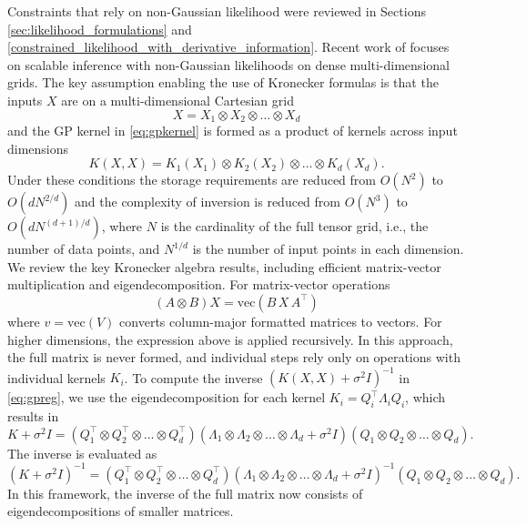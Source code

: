 \label{kronecker}
Constraints that rely on non-Gaussian likelihood were reviewed in Sections \ref{sec:likelihood_formulations} and \ref{constrained_likelihood_with_derivative_information}. Recent work of  focuses on scalable inference with non-Gaussian likelihoods on dense multi-dimensional grids.
The key assumption enabling the use of Kronecker formulas is that 
the inputs $X$ are on a multi-dimensional Cartesian grid
\begin{equation}
X=X_1\otimes X_2\otimes\ldots\otimes X_d
\end{equation}
and the GP
kernel in \eqref{eq:gpkernel} is formed as a product of kernels across 
input dimensions 
\begin{equation}
K(X,X)=K_1(X_1)\otimes K_2(X_2)\otimes\ldots\otimes K_d(X_d).
\end{equation}
Under these conditions the storage requirements are reduced from $O(N^2)$ to $O(dN^{2/d})$ and the complexity of inversion is reduced from  $O(N^3)$ to $O(dN^{(d+1)/d})$, where $N$ is the cardinality of the full tensor
grid, i.e., the number of data points, and $N^{1/d}$ is the number of input points in each dimension. 
We review the key Kronecker algebra results, including efficient matrix-vector 
multiplication and eigendecomposition. For matrix-vector operations
\[
(A\otimes B)X=\mathrm{vec}\left(B\,X\,A^\top\right)
\]
where $v = \mathrm{vec}(V)$ converts column-major formatted matrices to vectors.
For higher dimensions, the expression above is applied recursively. In this 
approach, the full matrix is never formed, and individual steps rely only on
operations with individual kernels $K_i$. To compute the inverse 
$(K(X,X)+\sigma^2 I)^{-1}$ in \eqref{eq:gpreg}, we use the eigendecomposition
for each kernel  $K_i=Q_i^\top\Lambda_i Q_i$, which results in
\[
K+\sigma^2 I =(Q_1^\top\otimes Q_2^\top\otimes\ldots \otimes Q_d^\top)(\Lambda_1\otimes\Lambda_2\otimes\ldots \otimes \Lambda_d
+\sigma^2 I )(Q_1\otimes Q_2\otimes\ldots \otimes Q_d).
\]
The inverse is evaluated as
\[
(K+\sigma^2 I)^{-1}=(Q_1^\top\otimes Q_2^\top\otimes\ldots \otimes Q_d^\top)
(\Lambda_1\otimes\Lambda_2\otimes\ldots \otimes \Lambda_d +\sigma^2 I )^{-1}(Q_1\otimes Q_2\otimes \ldots \otimes Q_d).
\]
In this framework, the inverse of the full matrix now consists of eigendecompositions
of smaller matrices.

